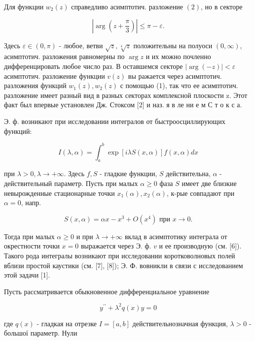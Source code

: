 \documentclass[10pt]{article}
\begin{document}
Для функции $w_{2}(z)$ справедливо асимптотич. разложение $(2)$, но в секторе



\[

\left|\arg \left(z+\frac{\pi}{3}\right)\right| \leqslant \pi-\varepsilon .

\]



Здесь $\varepsilon \in(0, \pi)$ - любое, ветви $\sqrt{z}, \sqrt[4]{z}$ положительны на полуоси $(0, \infty)$, асимптотич. разложения равномерны по $\arg z$ и их можно почленно дифференцировать любое число раз. В оставшемся секторе $|\arg (-z)|<\varepsilon$ асимптотич. разложение функции $v(z)$ вы ражается через асимптотич. разложения функций $w_{1}(z), w_{2}(z)$ с помощью (1), так что ее асимптотич. разложение имеет разный вид в разных секторах комплексной плоскости z. Этот факт был впервые установлен Дж. Стоксом [2] и наз. я в ле ни е м С т о к с а.



Э. ф. возникают при исследовании интегралов от быстроосциллирующих функций:



\[

I(\lambda, \alpha)=\int_{a}^{b} \exp [i \lambda S(x, \alpha)] f(x, \alpha) d x

\]



при $\lambda>0, \lambda \rightarrow+\infty$. Здесь $f, S$ - гладкие функции, $S$ действительна, $\alpha$ - действительный параметр. Пусть при малых $\alpha \geqslant 0$ фаза $S$ имеет две близкие невырожденные стационарные точки $x_{1}(\alpha), x_{2}(\alpha)$, к-рые совпадают при $\alpha=0$, напр.



\[

S(x, \alpha)=\alpha x-x^{3}+O\left(x^{4}\right) \text { при } x \rightarrow 0 .

\]



Тогда при малых $\alpha \geqslant 0$ и при $\lambda \rightarrow+\infty$ вклад в асимптотику интеграла от окрестности точки $x=0$ выражается через Э. ф. $v$ и ее производную (см. [6]). Такого рода интегралы возникают при исследовании коротковолновых полей вблизи простой каустики (см. [7], [8]); Э. Ф. вовникли в связи с исследованием этой задачи [1].



Пусть рассматривается обыкновенное дифференциальное уравнение



\[

y^{\prime \prime}+\lambda^{2} q(x) y=0

\]



где $q(x)$ - гладкая на отрезке $I=[a, b]$ действительнозначная функция, $\lambda>0$ - большої параметр. Нули
\end{document}

